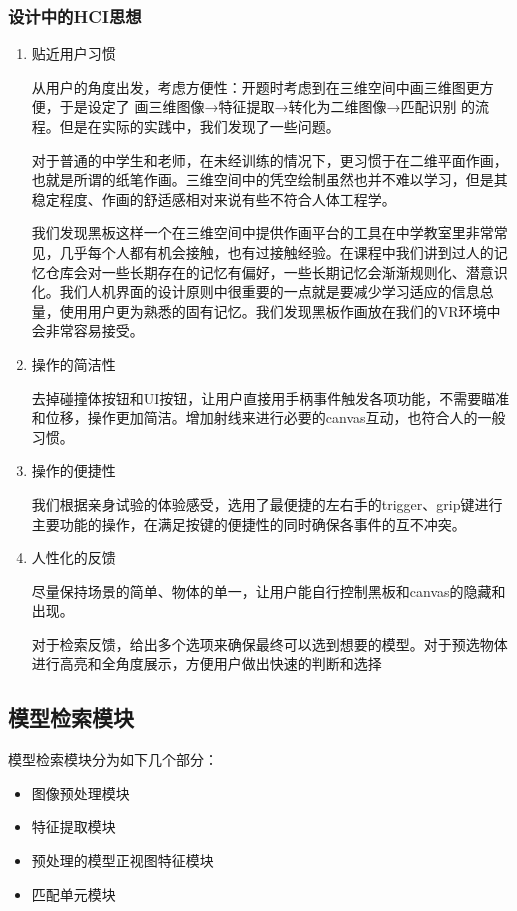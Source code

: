 \documentclass{article}
\begin{document}
\subsubsection{设计中的HCI思想}
\begin{enumerate}
    \item 贴近用户习惯
    
    \qquad 从用户的角度出发，考虑方便性：开题时考虑到在三维空间中画三维图更方便，于是设定了 画三维图像→特征提取→转化为二维图像→匹配识别 的流程。但是在实际的实践中，我们发现了一些问题。
    
    \qquad 对于普通的中学生和老师，在未经训练的情况下，更习惯于在二维平面作画，也就是所谓的纸笔作画。三维空间中的凭空绘制虽然也并不难以学习，但是其稳定程度、作画的舒适感相对来说有些不符合人体工程学。
    
    \qquad 我们发现黑板这样一个在三维空间中提供作画平台的工具在中学教室里非常常见，几乎每个人都有机会接触，也有过接触经验。在课程中我们讲到过人的记忆仓库会对一些长期存在的记忆有偏好，一些长期记忆会渐渐规则化、潜意识化。我们人机界面的设计原则中很重要的一点就是要减少学习适应的信息总量，使用用户更为熟悉的固有记忆。我们发现黑板作画放在我们的VR环境中会非常容易接受。

    \item 操作的简洁性
    
    \qquad 去掉碰撞体按钮和UI按钮，让用户直接用手柄事件触发各项功能，不需要瞄准和位移，操作更加简洁。增加射线来进行必要的canvas互动，也符合人的一般习惯。

    \item 操作的便捷性
    
    \qquad 我们根据亲身试验的体验感受，选用了最便捷的左右手的trigger、grip键进行主要功能的操作，在满足按键的便捷性的同时确保各事件的互不冲突。
    
    \item 人性化的反馈
    
    \qquad 尽量保持场景的简单、物体的单一，让用户能自行控制黑板和canvas的隐藏和出现。
    
    \qquad 对于检索反馈，给出多个选项来确保最终可以选到想要的模型。对于预选物体进行高亮和全角度展示，方便用户做出快速的判断和选择
    
\end{enumerate}

\subsection{模型检索模块}
模型检索模块分为如下几个部分：
\begin{itemize}
    \item 图像预处理模块
    \item 特征提取模块
    \item 预处理的模型正视图特征模块
    \item 匹配单元模块
\end{itemize}
\end{document}
